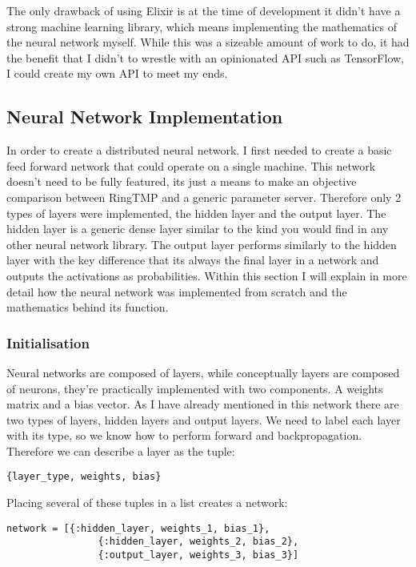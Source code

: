 The only drawback of using Elixir is at the time of development it didn't have a
strong machine learning library, which means implementing the mathematics of the
neural network myself. While this was a sizeable amount of work to do, it had
the benefit that I didn't to wrestle with an opinionated API such as TensorFlow,
I could create my own API to meet my ends.

\subsection{Neural Network Implementation}
In order to create a distributed neural network. I first needed to create a
basic feed forward network that could operate on a single machine. This network
doesn't need to be fully featured, its just a means to make an objective
comparison between RingTMP and a generic parameter server. Therefore only 2
types of layers were implemented, the hidden layer and the output layer. The
hidden layer is a generic dense layer similar to the kind you would find in any
other neural network library. The output layer performs similarly to the hidden
layer with the key difference that its always the final layer in a network and
outputs the activations as probabilities. Within this section I will explain in
more detail how the neural network was implemented from scratch and the
mathematics behind its function.

\subsubsection{Initialisation}
Neural networks are composed of layers, while conceptually layers are
composed of neurons, they're practically implemented with two components. A
weights matrix and a bias vector. As I have already mentioned in this network
there are two types of layers, hidden layers and output layers. We need to label
each layer with its type, so we know how to perform forward and
backpropagation. Therefore we can describe a layer as the tuple:
\begin{lstlisting}[numbers=none,frame=none]
    {layer_type, weights, bias}
\end{lstlisting}

Placing several of these tuples in a list creates a network:
\begin{lstlisting}[numbers=none,frame=none]
  network = [{:hidden_layer, weights_1, bias_1},
                {:hidden_layer, weights_2, bias_2},
                {:output_layer, weights_3, bias_3}]
\end{lstlisting}


